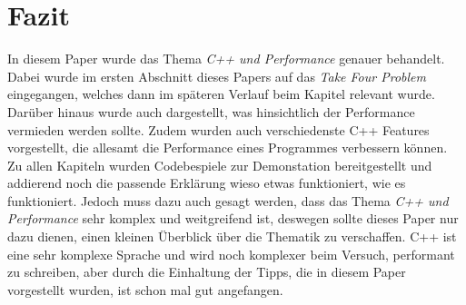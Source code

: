 \section{Fazit}\label{sec:fazit}
In diesem Paper wurde das Thema \emph{C++ und Performance} genauer behandelt. Dabei wurde im
ersten Abschnitt dieses Papers auf das \emph{Take Four Problem} eingegangen, welches dann im
späteren Verlauf beim Kapitel \emph{} relevant wurde. Darüber
hinaus wurde auch dargestellt, was hinsichtlich der Performance vermieden werden sollte. Zudem
wurden auch verschiedenste C++ Features vorgestellt, die allesamt die Performance eines
Programmes verbessern können. Zu allen Kapiteln wurden Codebespiele zur Demonstation
bereitgestellt und addierend noch die passende Erklärung wieso etwas funktioniert, wie es
funktioniert. Jedoch muss dazu auch gesagt werden, dass das Thema \emph{C++ und Performance} sehr
komplex und weitgreifend ist, deswegen sollte dieses Paper nur dazu dienen, einen kleinen Überblick
über die Thematik zu verschaffen. C++ ist eine sehr komplexe Sprache und wird noch komplexer beim
Versuch, performant zu schreiben, aber durch die Einhaltung der Tipps, die in diesem Paper
vorgestellt wurden, ist schon mal gut angefangen.